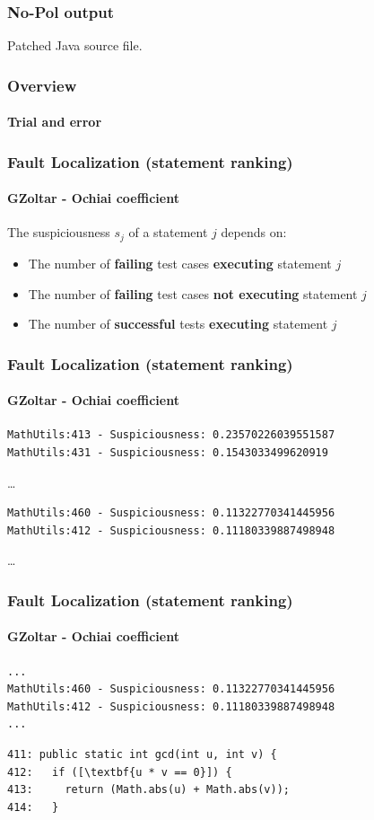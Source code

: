 \documentclass[onlymath]{beamer}
\begin{document}
\begin{frame}
\frametitle{No-Pol output}
Patched Java source file.
\end{frame}


\frame
{
    \frametitle{Overview}
    \framesubtitle{Trial and error}
  \begin{center}
  
  \end{center}
}


\begin{frame}[fragile]
    \frametitle{Fault Localization (statement ranking)}
      \framesubtitle{GZoltar - Ochiai coefficient}
The suspiciousness $s_j$ of a statement $j$ depends on:
\begin{itemize}
 \item The number of \textbf{failing} test cases \textbf{executing} statement $j$ 
 \item The number of \textbf{failing} test cases \textbf{not executing} statement $j$
 \item The number of \textbf{successful} tests \textbf{executing} statement $j$
\end{itemize}
\end{frame}


\begin{frame}[fragile]
\frametitle{Fault Localization (statement ranking)}
\framesubtitle{GZoltar - Ochiai coefficient}
\begin{verbatim}
MathUtils:413 - Suspiciousness: 0.23570226039551587
MathUtils:431 - Suspiciousness: 0.1543033499620919
\end{verbatim}
\dots
\begin{verbatim}
MathUtils:460 - Suspiciousness: 0.11322770341445956
MathUtils:412 - Suspiciousness: 0.11180339887498948
\end{verbatim}
\dots
\end{frame}


\begin{frame}[fragile]
\frametitle{Fault Localization (statement ranking)}
\framesubtitle{GZoltar - Ochiai coefficient}
\begin{verbatim}
...
MathUtils:460 - Suspiciousness: 0.11322770341445956
MathUtils:412 - Suspiciousness: 0.11180339887498948
...
\end{verbatim}

\begin{lstlisting}[escapeinside=\[\]]
411: public static int gcd(int u, int v) {
412:   if ([\textbf{u * v == 0}]) {
413:     return (Math.abs(u) + Math.abs(v));
414:   }
\end{lstlisting}
\end{frame}
\end{document}
